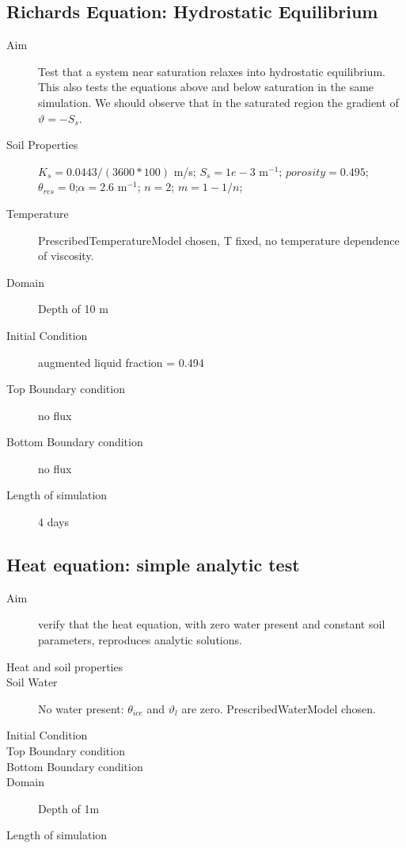 \documentclass[twoside,10pt]{report}
\begin{document}
\subsection{Richards Equation: Hydrostatic Equilibrium}
\begin{description}
\item [Aim] Test that a system near saturation relaxes into hydrostatic equilibrium. This also tests the equations above and below saturation in the same simulation. We should observe that in the saturated region the gradient of $\vartheta = -S_s$.
\item [Soil Properties] $K_s = 0.0443 / (3600*100)$ m/s; $S_s = 1e-3$ m$^{-1}$; $porosity=0.495$; $\theta_{res}=0$;$\alpha = 2.6$ m$^{-1}$; $n = 2$; $m = 1-1/n$;
\item [Temperature] PrescribedTemperatureModel chosen, T fixed, no temperature dependence of viscosity.
\item [Domain] Depth of 10 m
\item [Initial Condition] augmented liquid fraction = 0.494
\item [Top Boundary condition] no flux
\item [Bottom Boundary condition] no flux
\item [Length of simulation] 4 days
\end{description}

\subsection{Heat equation: simple analytic test}
\begin{description}
\item [Aim]  verify that the heat equation, with zero water present and constant soil parameters, reproduces analytic solutions.
\item [Heat and soil properties]
\item [Soil Water] No water present: $\theta_{ice}$ and $\vartheta_l$ are zero. PrescribedWaterModel chosen.
\item [Initial Condition] 
\item [Top Boundary condition] 
\item [Bottom Boundary condition]
\item [Domain] Depth of 1m
\item [Length of simulation]
\end{description}
\end{document}
